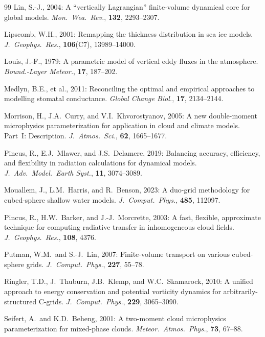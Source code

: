 \documentclass[11pt,twoside]{report}
\begin{document}
\begin{thebibliography}{99}
Lin, S.-J., 2004:
A ``vertically Lagrangian'' finite-volume dynamical core for global models.
\textit{Mon.\ Wea.\ Rev.}, \textbf{132}, 2293--2307.

Lipscomb, W.H., 2001:
Remapping the thickness distribution in sea ice models.
\textit{J.\ Geophys.\ Res.}, \textbf{106}(C7), 13989--14000.

Louis, J.-F., 1979:
A parametric model of vertical eddy fluxes in the atmosphere.
\textit{Bound.-Layer Meteor.}, \textbf{17}, 187--202.

Medlyn, B.E., et al., 2011:
Reconciling the optimal and empirical approaches to modelling stomatal
conductance.
\textit{Global Change Biol.}, \textbf{17}, 2134--2144.

Morrison, H., J.A.~Curry, and V.I.~Khvorostyanov, 2005:
A new double-moment microphysics parameterization for application in
cloud and climate models. Part~I: Description.
\textit{J.\ Atmos.\ Sci.}, \textbf{62}, 1665--1677.

Pincus, R., E.J.~Mlawer, and J.S.~Delamere, 2019:
Balancing accuracy, efficiency, and flexibility in radiation calculations
for dynamical models.
\textit{J.\ Adv.\ Model.\ Earth Syst.}, \textbf{11}, 3074--3089.

Mouallem, J., L.M.~Harris, and R.~Benson, 2023:
A duo-grid methodology for cubed-sphere shallow water models.
\textit{J.\ Comput.\ Phys.}, \textbf{485}, 112097.

Pincus, R., H.W.~Barker, and J.-J.~Morcrette, 2003:
A fast, flexible, approximate technique for computing radiative transfer in
inhomogeneous cloud fields.
\textit{J.\ Geophys.\ Res.}, \textbf{108}, 4376.

Putman, W.M.\ and S.-J.~Lin, 2007:
Finite-volume transport on various cubed-sphere grids.
\textit{J.\ Comput.\ Phys.}, \textbf{227}, 55--78.

Ringler, T.D., J.~Thuburn, J.B.~Klemp, and W.C.~Skamarock, 2010:
A unified approach to energy conservation and potential vorticity dynamics
for arbitrarily-structured C-grids.
\textit{J.\ Comput.\ Phys.}, \textbf{229}, 3065--3090.

Seifert, A.\ and K.D.~Beheng, 2001:
A two-moment cloud microphysics parameterization for mixed-phase clouds.
\textit{Meteor.\ Atmos.\ Phys.}, \textbf{73}, 67--88.


\end{thebibliography}
\end{document}
